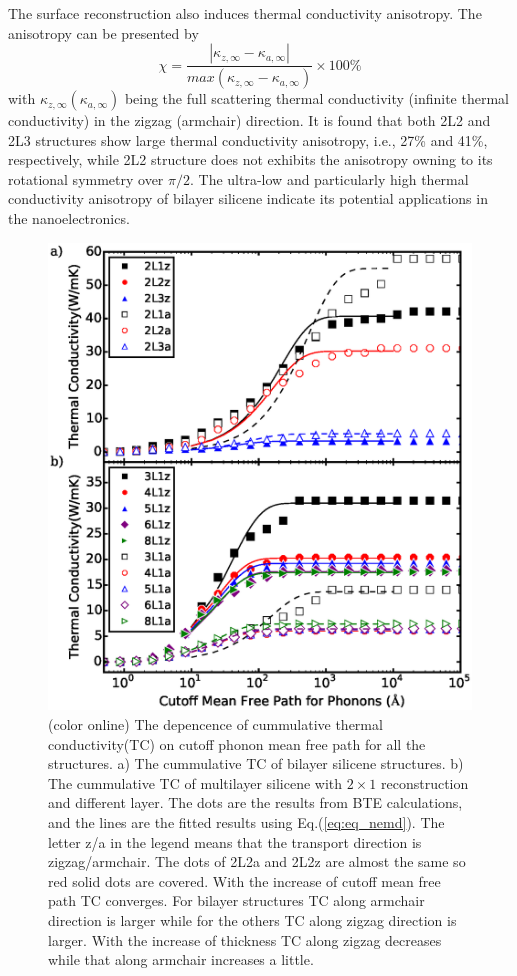 \documentclass[review]{elsarticle}
\begin{document}
The surface reconstruction also induces thermal conductivity anisotropy. The anisotropy can be presented by
\begin{equation}
  \chi=\frac{|\kappa_{z,\infty}-\kappa_{a,\infty} |}{ max⁡(\kappa_{z,\infty}-\kappa_{a,\infty} ) } \times 100 \%  \label{eq:eq_chi}
\end{equation}
with $ \kappa_{z,\infty} (\kappa_{a,\infty})$ being the full scattering thermal conductivity (infinite thermal conductivity) in the zigzag (armchair) direction.
It is found that both 2L2 and 2L3 structures show large thermal conductivity anisotropy, i.e., 27\% and 41\%, respectively, while 2L2 structure does not exhibits the anisotropy owning to its rotational symmetry over $\pi/2$.  The ultra-low and particularly high thermal conductivity anisotropy of bilayer silicene indicate its potential applications in the nanoelectronics.

\begin{figure}[b]
  \includegraphics[angle= 0, width=0.9\linewidth]{images/tc_length_sheng.eps}
  \caption{\label{fig:tc_length_sheng} (color online) The depencence of cummulative thermal conductivity(TC) on cutoff phonon mean free path for all the structures. a) The cummulative TC of bilayer silicene structures. b) The cummulative TC of multilayer silicene with $2\times 1$ reconstruction and different layer. The dots are the results from BTE calculations, and the lines are the fitted results using Eq.(\ref{eq:eq_nemd}). The letter z/a in the legend means that the transport direction is zigzag/armchair. The dots of 2L2a and 2L2z are almost the same so red solid dots are covered. With the increase of cutoff mean free path TC converges. For bilayer structures TC along armchair direction is larger while for the others TC along zigzag direction is larger. With the increase of thickness TC along zigzag decreases while that along armchair increases a little. }
\end{figure}
\end{document}
